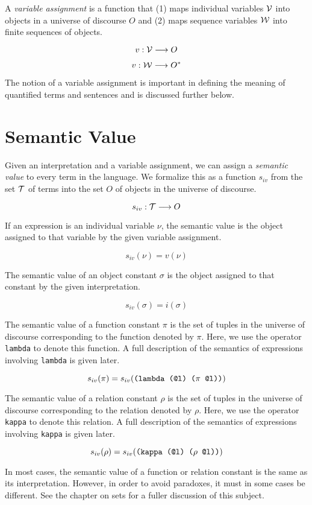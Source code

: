 A {\it variable assignment} is a function that (1) maps individual variables
${\cal V}$ into objects in a universe of discourse $O$ and (2) maps sequence
variables ${\cal W}$ into finite sequences of objects.

$$v:{\cal V}\longrightarrow O$$

$$v:{\cal W}\longrightarrow O^*$$

The notion of a variable assignment is important in defining the meaning of
quantified terms and sentences and is discussed further below.

\section{Semantic Value}

Given an interpretation and a variable assignment, we can assign a {\it
semantic value} to every term in the language.  We formalize this as a
function $s_{iv}$ from the set ${\cal T}$ of terms into the set $O$
of objects in the universe of discourse.

$$s_{iv}:{\cal T}\longrightarrow O$$

If an expression is an individual variable $\nu$, the semantic value is the
object assigned to that variable by the given variable assignment.

$$s_{iv}(\nu)=v(\nu)$$

The semantic value of an object constant $\sigma$ is the object assigned to
that constant by the given interpretation.

$$s_{iv}(\sigma)=i(\sigma)$$

The semantic value of a function constant $\pi$ is the set of tuples in the universe
of discourse corresponding to the function denoted by $\pi$.  Here, we use the
operator {\tt lambda} to denote this function.  A full description of the semantics of
expressions involving {\tt lambda} is given later.

$$s_{iv}(\pi)=s_{iv}(\hbox{\tt (lambda (@l) ($\pi$ @l))})$$

The semantic value of a relation constant $\rho$ is the set of tuples in the universe
of discourse corresponding to the relation denoted by $\rho$.  Here, we use the
operator {\tt kappa} to denote this relation.  A full description of the semantics of
expressions involving {\tt kappa} is given later.

$$s_{iv}(\rho)=s_{iv}(\hbox{\tt (kappa (@l) ($\rho$ @l))})$$

In most cases, the semantic value of a function or relation constant is the same as
its interpretation.  However, in order to avoid paradoxes, it must in some cases be
different.  See the chapter on sets for a fuller discussion of this subject.

